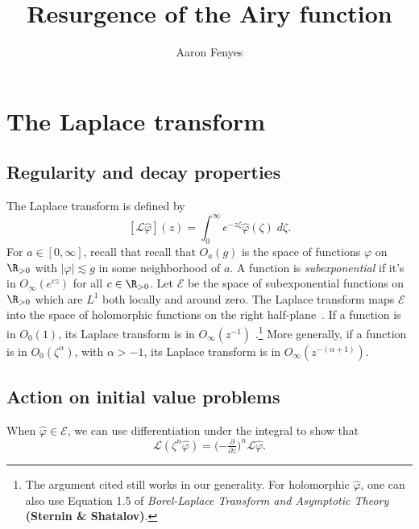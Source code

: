 \documentclass{article}
\title{Resurgence of the Airy function}
\author{Aaron Fenyes}
\theoremstyle{definition}
\theoremstyle{plain}
\newcommand{\posreal}{\R_{> 0}}
\newcommand{\laplace}{\mathcal{L}}
\begin{document}
\maketitle
\section{The Laplace transform}
\subsection{Regularity and decay properties}
The Laplace transform is defined by
\[ [\mathcal{L}\hat{\varphi}](z) = \int_0^\infty e^{-z \zeta} \hat{\varphi}(\zeta)\;d\zeta. \]
For $a \in [0, \infty]$, recall that recall that $O_a(g)$ is the space of functions $\varphi$ on $\posreal$ with $|\varphi| \lesssim g$ in some neighborhood of $a$. A function is {\em subexponential} if it's in $O_\infty(e^{cz})$ for all $c \in \posreal$. Let $\mathcal{E}$ be the space of subexponential functions on $\posreal$ which are $L^1$ both locally and around zero. The Laplace transform maps $\mathcal{E}$ into the space of holomorphic functions on the right half-plane~\cite[\S 5.6]{diverg-resurg-i}. If a function is in $O_0(1)$, its Laplace transform is in $O_\infty(z^{-1})$ \cite[equation~1.8]{laplace-tfm}.\footnote{The argument cited still works in our generality. For holomorphic $\hat{\varphi}$, one can also use Equation 1.5 of {\em Borel-Laplace Transform and Asymptotic Theory} \textbf{(Sternin \& Shatalov)}.} More generally, if a function is in $O_0(\zeta^\alpha)$, with $\alpha > -1$, its Laplace transform is in $O_\infty(z^{-(\alpha + 1)})$.
\subsection{Action on initial value problems}
When $\hat{\varphi} \in \mathcal{E}$, we can use differentiation under the integral to show that~\cite[Theorem~1.34]{laplace-tfm}
\[ \laplace (\zeta^n \hat{\varphi}) = \big({-\tfrac{\partial}{\partial z}}\big)^n \laplace \hat{\varphi}. \]
\end{document}
